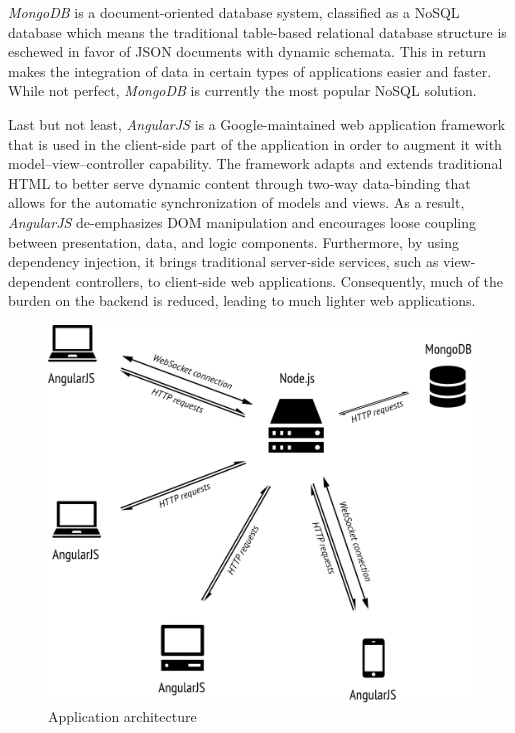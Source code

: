 \documentclass[thesis=M,english,hidelinks]{FITthesis}[2012/10/20]
\begin{document}
\textit{MongoDB} \cite{mongodb} is a document-oriented database system, classified as a NoSQL database which means the traditional table-based relational database structure is eschewed in favor of JSON documents with dynamic schemata. This in return makes the integration of data in certain types of applications easier and faster. While not perfect, \textit{MongoDB} is currently the most popular NoSQL solution.

Last but not least, \textit{AngularJS} \cite{angularjs} is a Google-maintained web application framework that is used in the client-side part of the application in order to augment it with model–view–controller capability. The framework adapts and extends traditional HTML to better serve dynamic content through two-way data-binding that allows for the automatic synchronization of models and views. As a result, \textit{AngularJS} de-emphasizes DOM manipulation and encourages loose coupling between presentation, data, and logic components. Furthermore, by using dependency injection, it brings traditional server-side services, such as view-dependent controllers, to client-side web applications. Consequently, much of the burden on the backend is reduced, leading to much lighter web applications.

\begin{figure}[h]
  \includegraphics[width=\textwidth]{architecture.png}
  \caption{Application architecture}
  \label{fig:architecture}
\end{figure}
\end{document}
